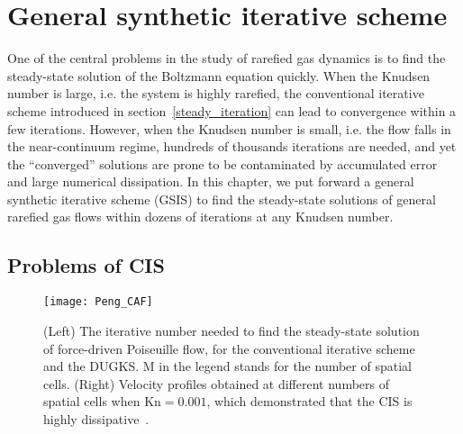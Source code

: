 \chapter{General synthetic iterative scheme}
\label{chap:GSIS}


One of the central problems in the study of rarefied gas dynamics is to find the steady-state solution of the Boltzmann equation quickly. When the Knudsen number is large, i.e. the system is highly rarefied, the conventional iterative scheme introduced in section~\ref{steady_iteration} can lead to convergence within a few iterations. However, when the Knudsen number is small, i.e. the flow falls in the near-continuum regime, hundreds of thousands iterations are needed, and yet the ``converged'' solutions are prone to be contaminated by accumulated error and large numerical dissipation. In this chapter, we put forward a general synthetic iterative scheme (GSIS) to find the steady-state solutions of general rarefied gas flows within dozens of iterations at any Knudsen number. 




\section{Problems of CIS }

\begin{figure}[t]
	\centering
	\texttt{[image: Peng\_CAF]}
	\caption{ (Left) The iterative number needed to find the steady-state solution of force-driven Poiseuille flow, for the conventional iterative scheme and the DUGKS. M in the legend stands for the number of spatial cells. (Right) Velocity profiles obtained at different numbers of spatial cells when  $\text{Kn}=0.001$, which demonstrated that the CIS is highly dissipative~\cite{WANG201833}.  }
	\label{fig:Peng_CAF}
\end{figure}


